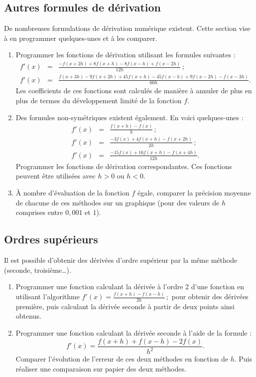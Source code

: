 \subsection{Autres formules de dérivation}

De  nombreuses  formulations  de  dérivation  numérique  existent.  Cette
section vise à en programmer quelques-unes et à les comparer.
\begin{enumerate}
\item Programmer les fonctions de dérivation utilisant les formules suivantes :
  \begin{eqnarray*}
f'(x) &=& \frac{-f(x+2h)+8f(x+h)-8f(x-h)+f(x-2h)}{12h}\,; \\
f'(x) &=& \frac{f(x+3h)-9f(x+2h)+45f(x+h)-45f(x-h)+9f(x-2h)-f(x-3h)}{60h}.
  \end{eqnarray*}
Les coefficients de ces fonctions sont calculés de manière à annuler de plus en
plus de termes du développement limité de la fonction $f$.
\item Des formules non-symétriques existent également. En voici quelques-unes :
   \begin{eqnarray*}
f'(x) &=& \frac{f(x+h)-f(x)}{h}\,;\\
f'(x) &=& \frac{-3f(x)+4f(x+h) -f(x+2h)}{2h}\,;\\
f'(x) &=& \frac{-15f(x)+16f(x+h) -f(x+4h)}{12h}.
  \end{eqnarray*}
 Programmer les fonctions de dérivation correspondantes. Ces fonctions peuvent être utilisées avec $h>0$ ou $h<0$.
\item  À nombre  d'évaluation de  la fonction  $f$ égale,  comparer la
  précision moyenne de chacune de  ces méthodes sur un graphique (pour
  des valeurs de $h$ comprises entre $0,001$ et $1$).
\end{enumerate}



\subsection{Ordres supérieurs \sc{[Facultatif]}}
Il est possible  d'obtenir des dérivées d'ordre supérieur  par la même
méthode (seconde, troisième\ldots).
\begin{enumerate}
\item Programmer une  fonction calculant la dérivée à  l'ordre 2 d'une
  fonction        en       utilisant        l'algorithme       $f'(x)=
  \frac{f(x+h)-f(x-h)}{2h}\,;$  pour  obtenir des  dérivées  première,
  puis  calculant la  dérivée seconde  à partir  de deux  points ainsi
  obtenus.
\item Programmer une fonction calculant la dérivée seconde à l'aide de
  la formule :
$$f'(x)=  \frac{f(x+h)+f(x-h)-2f(x)}{h^2}.$$  Comparer l'évolution  de
  l'erreur de ces deux méthodes en  fonction de $h$. Puis réaliser une
  comparaison \og{} sur papier \fg{} des deux méthodes.
\end{enumerate}


